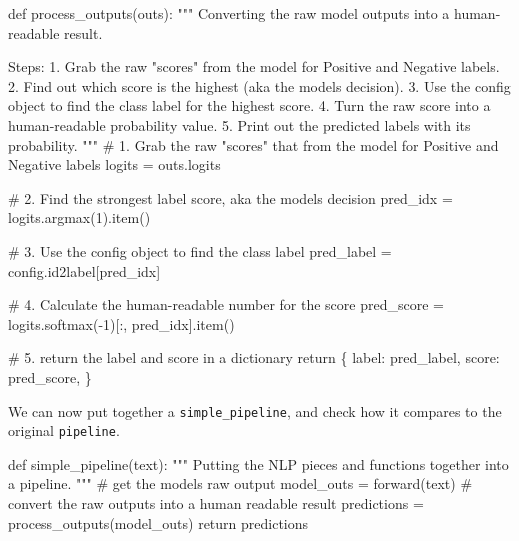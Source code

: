 \documentclass[
  letterpaper,
  DIV=11,
  numbers=noendperiod]{scrartcl}
\newenvironment{Shaded}{\begin{snugshade}}{\end{snugshade}}
\newcommand{\CommentTok}[1]{\textcolor[rgb]{0.37,0.37,0.37}{#1}}
\newcommand{\ControlFlowTok}[1]{\textcolor[rgb]{0.00,0.23,0.31}{#1}}
\newcommand{\DecValTok}[1]{\textcolor[rgb]{0.68,0.00,0.00}{#1}}
\newcommand{\KeywordTok}[1]{\textcolor[rgb]{0.00,0.23,0.31}{#1}}
\newcommand{\NormalTok}[1]{\textcolor[rgb]{0.00,0.23,0.31}{#1}}
\newcommand{\OperatorTok}[1]{\textcolor[rgb]{0.37,0.37,0.37}{#1}}
\newcommand{\StringTok}[1]{\textcolor[rgb]{0.13,0.47,0.30}{#1}}
\begin{document}
\begin{Shaded}
\begin{Highlighting}[]
\KeywordTok{def}\NormalTok{ process\_outputs(outs):}
    \CommentTok{"""}
\CommentTok{    Converting the raw model outputs into a human{-}readable result.}

\CommentTok{    Steps:}
\CommentTok{        1. Grab the raw "scores" from the model for Positive and Negative labels.  }
\CommentTok{        2. Find out which score is the highest (aka the model\textquotesingle{}s decision).  }
\CommentTok{        3. Use the \textasciigrave{}config\textasciigrave{} object to find the class label for the highest score.  }
\CommentTok{        4. Turn the raw score into a human{-}readable probability value.  }
\CommentTok{        5. Print out the predicted labels with its probability.  }
\CommentTok{    """}
    \CommentTok{\# 1. Grab the raw "scores" that from the model for Positive and Negative labels}
\NormalTok{    logits }\OperatorTok{=}\NormalTok{ outs.logits}

    \CommentTok{\# 2. Find the strongest label score, aka the model\textquotesingle{}s decision}
\NormalTok{    pred\_idx }\OperatorTok{=}\NormalTok{ logits.argmax(}\DecValTok{1}\NormalTok{).item()}

    \CommentTok{\# 3. Use the \textasciigrave{}config\textasciigrave{} object to find the class label}
\NormalTok{    pred\_label }\OperatorTok{=}\NormalTok{ config.id2label[pred\_idx]  }

    \CommentTok{\# 4. Calculate the human{-}readable number for the score}
\NormalTok{    pred\_score }\OperatorTok{=}\NormalTok{ logits.softmax(}\OperatorTok{{-}}\DecValTok{1}\NormalTok{)[:, pred\_idx].item()}

    \CommentTok{\# 5. return the label and score in a dictionary}
    \ControlFlowTok{return}\NormalTok{ \{}
        \StringTok{\textquotesingle{}label\textquotesingle{}}\NormalTok{: pred\_label,}
        \StringTok{\textquotesingle{}score\textquotesingle{}}\NormalTok{: pred\_score, }
\NormalTok{    \}}
\end{Highlighting}
\end{Shaded}

We can now put together a \texttt{simple\_pipeline}, and check how it
compares to the original \texttt{pipeline}.

\begin{Shaded}
\begin{Highlighting}[]
\KeywordTok{def}\NormalTok{ simple\_pipeline(text):}
    \CommentTok{"""}
\CommentTok{    Putting the NLP pieces and functions together into a pipeline.}
\CommentTok{    """}
    \CommentTok{\# get the model\textquotesingle{}s raw output}
\NormalTok{    model\_outs }\OperatorTok{=}\NormalTok{ forward(text)}
    \CommentTok{\# convert the raw outputs into a human readable result}
\NormalTok{    predictions }\OperatorTok{=}\NormalTok{ process\_outputs(model\_outs)}
    \ControlFlowTok{return}\NormalTok{ predictions}
\end{Highlighting}
\end{Shaded}
\end{document}
